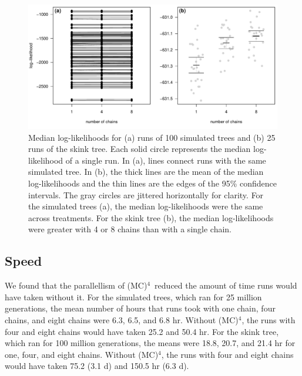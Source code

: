 \documentclass[12pt]{article}
\newcommand{\MCMCMCMC}{(MC)$^{4}$}
\begin{document}
\begin{figure}
\begin{center}
\includegraphics[width=14cm]{median-log-like.pdf}
\end{center}
\caption{Median log-likelihoods for (a) runs of 100 simulated trees
    and (b) 25 runs of the skink tree.
    Each solid circle represents the median log-likelihood of a single run.
    In (a), lines connect runs with the same simulated tree.
    In (b), the thick lines are the mean of the median log-likelihoods
    and the thin lines are the edges of the 95\% confidence intervals.
    The gray circles are jittered horizontally for clarity.
    For the simulated trees (a), the median log-likelihoods were the same
    across treatments.
    For the skink tree (b), the median log-likelihoods were greater
    with 4 or 8 chains than with a single chain.}
\label{fig:median-log-like}
\end{figure}


\subsection*{Speed}

We found that the parallellism of \MCMCMCMC\ 
reduced the amount of time runs would have taken without it.
%
For the simulated trees, which ran for 25 million generations,
the mean number of hours that runs took with
one chain, four chains, and eight chains were
6.3, 6.5, and 6.8 hr.
%
Without \MCMCMCMC, the runs with four and eight chains
would have taken 25.2 and 50.4 hr.
%
For the skink tree, which ran for 100 million generations,
the means were 18.8, 20.7, and 21.4 hr for one, four, and eight chains.
%
Without \MCMCMCMC, the runs with four and eight chains
would have taken 75.2 (3.1 d) and 150.5 hr (6.3 d).


\end{document}
